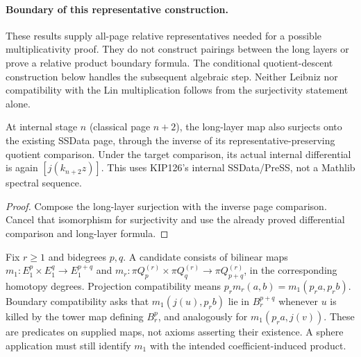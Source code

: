 \paragraph{Boundary of this representative construction.}
These results supply all-page relative representatives needed for a
possible multiplicativity proof. They do not construct pairings between
the long layers or prove a relative product boundary formula. The conditional
quotient-descent construction below handles the subsequent algebraic step.
Neither Leibniz nor compatibility with the Lin multiplication follows from
the surjectivity statement alone.

\begin{proposition}
  \label{prop:h6-tower-long-layer-internal}
  \leanok
  At internal stage $n$ (classical page $n+2$), the long-layer map also
  surjects onto the existing SSData page, through the inverse of its
  representative-preserving quotient comparison. Under the target
  comparison, its actual internal differential is again $[j(k_{n+2}z)]$.
  This uses KIP126's internal SSData/PreSS, not a Mathlib spectral sequence.
\end{proposition}
\begin{proof}
  Compose the long-layer surjection with the inverse page comparison.
  Cancel that isomorphism for surjectivity and use the already proved
  differential comparison and long-layer formula.
  \leanok
\end{proof}

\begin{definition}
  \label{def:h6-long-pairing-inputs}
  \leanok
  Fix $r\ge1$ and bidegrees $p,q$. A candidate consists of bilinear maps
  $m_1:E_1^p\times E_1^q\to E_1^{p+q}$ and
  $m_r:\pi Q_p^{(r)}\times\pi Q_q^{(r)}\to\pi Q_{p+q}^{(r)}$,
  in the corresponding homotopy degrees. Projection compatibility means
  $p_rm_r(a,b)=m_1(p_ra,p_rb)$.
  Boundary compatibility asks that $m_1(j(u),p_rb)$ lie in $B_r^{p+q}$
  whenever $u$ is killed by the tower map defining $B_r^p$, and analogously
  for $m_1(p_ra,j(v))$. These are predicates on supplied maps, not axioms
  asserting their existence. A sphere application must still identify $m_1$
  with the intended coefficient-induced product.
\end{definition}

